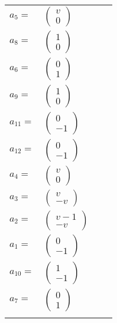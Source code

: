 \documentclass[1p]{elsarticle_modified}
\theoremstyle{definition}
\begin{document}
\begin{tabular}{m{7pt} m{180pt} m{7pt} m{180pt} }
\flushright $a_{5}=$&$\begin{pmatrix}v\\0\end{pmatrix}$ \\
\flushright $a_{8}=$&$\begin{pmatrix}1\\0\end{pmatrix}$ \\
\flushright $a_{6}=$&$\begin{pmatrix}0\\1\end{pmatrix}$ \\
\flushright $a_{9}=$&$\begin{pmatrix}1\\0\end{pmatrix}$ \\
\flushright $a_{11}=$&$\begin{pmatrix}0\\-1\end{pmatrix}$ \\
\flushright $a_{12}=$&$\begin{pmatrix}0\\-1\end{pmatrix}$ \\
\flushright $a_{4}=$&$\begin{pmatrix}v\\0\end{pmatrix}$ \\
\flushright $a_{3}=$&$\begin{pmatrix}v\\- v\end{pmatrix}$ \\
\flushright $a_{2}=$&$\begin{pmatrix}v-1\\- v\end{pmatrix}$ \\
\flushright $a_{1}=$&$\begin{pmatrix}0\\-1\end{pmatrix}$ \\
\flushright $a_{10}=$&$\begin{pmatrix}1\\-1\end{pmatrix}$ \\
\flushright $a_{7}=$&$\begin{pmatrix}0\\1\end{pmatrix}$\\&\end{tabular}
\end{document}
